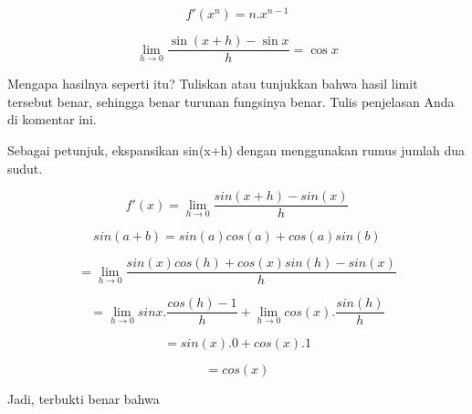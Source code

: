 \documentclass[a4paper,10pt]{article}
\begin{document}
\begin{eulernotebook}
\begin{eulercomment}
\begin{eulercomment}
\begin{eulercomment}
\begin{eulercomment}
\begin{eulercomment}
\begin{eulercomment}
\begin{eulercomment}
\begin{eulercomment}
\begin{eulerformula}
\[
f'(x^n) = n.x^{n-1}
\]
\end{eulerformula}
\eulersubheading{}
\begin{eulerformula}
\[
\lim_{h\rightarrow 0}{\frac{\sin \left(x+h\right)-\sin x}{h}}=\cos 
 x
\]
\end{eulerformula}
\begin{eulercomment}
Mengapa hasilnya seperti itu? Tuliskan atau tunjukkan bahwa hasil
limit tersebut benar, sehingga benar turunan fungsinya benar. Tulis
penjelasan Anda di komentar ini. 

Sebagai petunjuk, ekspansikan sin(x+h) dengan menggunakan rumus jumlah
dua sudut.

\end{eulercomment}
\begin{eulercomment}
\end{eulercomment}
\begin{eulerformula}
\[
f'(x) = \lim_{h\to 0} \frac{sin(x+h)-sin(x)}{h}
\]
\end{eulerformula}
\begin{eulercomment}
\end{eulercomment}
\begin{eulerformula}
\[
sin(a+b)=sin(a)cos(a)+cos(a)sin(b)
\]
\end{eulerformula}
\begin{eulercomment}
\end{eulercomment}
\begin{eulerformula}
\[
= \lim_{h\to 0} \frac{sin(x)cos(h)+cos(x)sin(h)-sin(x)}{h}
\]
\end{eulerformula}
\begin{eulercomment}
\end{eulercomment}
\begin{eulerformula}
\[
= \lim_{h\to 0} sinx.\frac{cos(h)-1}{h}+\lim_{h\to 0} cos(x).\frac{sin(h)}{h}
\]
\end{eulerformula}
\begin{eulerformula}
\[
= sin(x).0+cos(x).1
\]
\end{eulerformula}
\begin{eulercomment}
\end{eulercomment}
\begin{eulerformula}
\[
= cos(x)
\]
\end{eulerformula}
\begin{eulercomment}
Jadi, terbukti benar bahwa


\end{eulercomment}
\end{eulercomment}
\end{eulercomment}
\end{eulercomment}
\end{eulercomment}
\end{eulercomment}
\end{eulercomment}
\end{eulercomment}
\end{eulercomment}
\end{eulernotebook}
\end{document}
